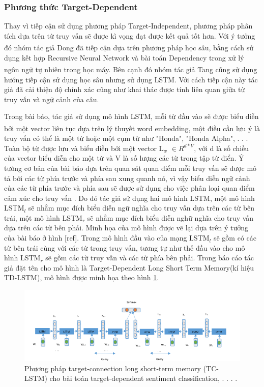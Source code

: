 \documentclass[fontsize=12pt]{scrartcl}
\begin{document}
\subsubsection{Phương thức Target-Dependent}
Thay vì tiếp cận sử dụng phương pháp Target-Independent, phương pháp phân tích dựa trên từ truy vấn sẽ được kì vọng đạt được kết quả tốt hơn. Với ý tưởng đó nhóm tác giả Dong\textsuperscript{\cite{dongadaptive}} đã tiếp cận dựa trên phương pháp học sâu, bằng cách sử dụng kết hợp Recursive Neural Network và bài toán Dependency trong xử lý ngôn ngữ tự nhiên trong học máy. Bên cạnh đó nhóm tác giả Tang\textsuperscript{\cite{tang2015effective}} cũng sử dụng hướng tiếp cận sử dụng học sâu nhưng sử dụng LSTM. Với cách tiếp cận này tác giả đã cải thiện độ chính xác cũng như khai thác được tính liên quan giữa từ truy vấn và ngữ cảnh của câu.
\par
Trong bài báo, tác giả sử dụng mô hình LSTM, mỗi từ đầu vào sẽ được biểu diễn bởi một vector liên tục dựa trên lý thuyết word embedding\textsuperscript{\cite{bengio2003neural}}, một điều cần lưu ý là truy vấn có thể là một từ hoặc một cụm từ như "Honda", "Honda Alpha", . . . Toàn bộ từ được lưu và biểu diễn bởi một vector L$_{w}$ $\in R^{d*V}$, với d là số chiều của vector biểu diễn cho một từ và V là số lượng các từ trong tập từ điển. Ý tưởng cơ bản của bài báo dựa trên quan sát quan điểm mỗi truy vấn sẽ được mô tả bởi các từ phía trước và phía sau xung quanh nó, vì vậy biểu diễn ngữ cảnh của các từ phía trước và phía sau sẽ được sử dụng cho việc phân loại quan điểm cảm xúc cho truy vấn . Do đó tác giả sử dụng hai mô hình LSTM, một mô hình LSTM$_{l}$ sẽ nhằm mục đích biểu diễn ngữ nghĩa cho truy vấn dựa trên các từ bên trái, một mô hình LSTM$_{r}$ sẽ nhằm mục đích biểu diễn nghữ nghĩa cho truy vấn dựa trên các từ bên phải. Minh họa của mô hình được vẽ lại dựa trên ý tưởng của bài báo ở hình [ref]. Trong mô hình đầu vào của mạng LSTM$_{l}$ sẽ gồm có các từ bên trái cùng với các từ trong truy vấn, tương tự như thế đầu vào cho mô hình LSTM$_{r}$ sẽ gồm các từ truy vấn và các từ phía bên phải. Trong báo cáo tác giả đặt tên cho mô hình là Target-Dependent Long Short Term Memory(kí hiệu TD-LSTM), mô hình được minh họa theo hình \ref{img_td_lstm}.
\begin{figure}
     \includegraphics[width=\textwidth]{img/td_lstm}
      \caption{Phương pháp target-connection long short-term memory (TC-LSTM) cho bài toán  target-dependent sentiment classification, . . . . }
       \label{img_td_lstm}
\end{figure}
\end{document}
